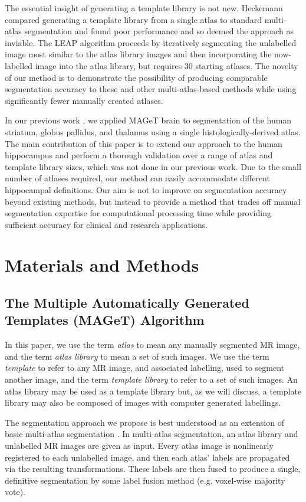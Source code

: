\documentclass{article}\usepackage[]{graphicx}\usepackage[]{color}
\begin{document}
The essential insight of generating a template library is not new.  Heckemann
\citep{Heckemann2006} compared generating a template library from a single atlas
to standard multi-atlas segmentation and found poor performance and so deemed
the approach as inviable.  The LEAP algorithm \citep{Wolz2010} proceeds by
iteratively segmenting the unlabelled image most similar to the atlas library
images and then incorporating the now-labelled image into the atlas library,
but requires 30 starting atlases.  The novelty of our method is to demonstrate
the possibility of producing comparable segmentation accuracy to these and
other multi-atlas-based methods while using significantly fewer manually
created atlases.

In our previous work \citep{Chakravarty2012}, we applied MAGeT brain to
segmentation of the human striatum, globus pallidus, and thalamus using a
single histologically-derived atlas. The main contribution of this paper is to
extend our approach to the human hippocampus and perform a thorough validation
over a range of atlas and template library sizes, which was not done in our
previous work.  Due to the small number of atlases required, our method can
easily accommodate different hippocampal definitions. Our aim is not to improve
on segmentation accuracy beyond existing methods, but instead to provide a
method that trades off manual segmentation expertise for computational
processing time while providing sufficient accuracy for clinical and research
applications.


\section{Materials and Methods} 
\subsection{The Multiple Automatically Generated Templates (MAGeT) Algorithm}

In this paper, we use the term {\it atlas} to mean any manually segmented MR
image, and the term {\it atlas library} to mean a set of such images.  We use
the term {\it template} to refer to any MR image, and associated labelling,
used to segment another image, and the term {\it template library} to refer to
a set of such images.  An atlas library may be used as a template library but,
as we will discuss, a template library may also be composed of images with
computer generated labellings. 

The segmentation approach we propose is best understood as an extension of
basic multi-atlas segmentation \citep{Collins2010}.  In multi-atlas segmentation,
an atlas library and unlabelled MR images are given as input.  Every atlas
image is nonlinearly registered to each unlabelled image, and then each atlas'
labels are propagated via the resulting transformations.  These labels are then
fused to produce a single, definitive segmentation by some label fusion method
(e.g.  voxel-wise majority vote). 
\end{document}
